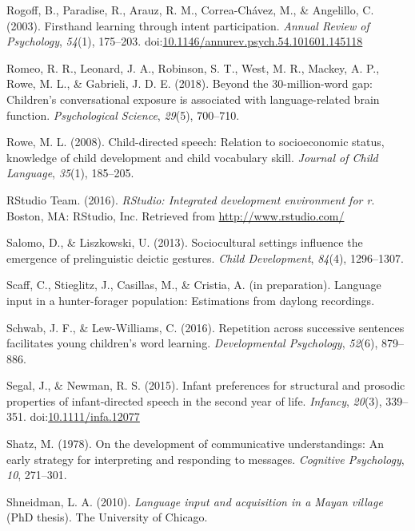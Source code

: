 \documentclass[floatsintext,man]{apa6}
\theoremstyle{definition}
\theoremstyle{definition}
\theoremstyle{definition}
\theoremstyle{remark}
\begin{document}
\hypertarget{ref-rogoff2003firsthand}{}
Rogoff, B., Paradise, R., Arauz, R. M., Correa-Chávez, M., \& Angelillo,
C. (2003). Firsthand learning through intent participation. \emph{Annual
Review of Psychology}, \emph{54}(1), 175--203.
doi:\href{https://doi.org/10.1146/annurev.psych.54.101601.145118}{10.1146/annurev.psych.54.101601.145118}

\hypertarget{ref-romeo2018beyond}{}
Romeo, R. R., Leonard, J. A., Robinson, S. T., West, M. R., Mackey, A.
P., Rowe, M. L., \& Gabrieli, J. D. E. (2018). Beyond the
30-million-word gap: Children's conversational exposure is associated
with language-related brain function. \emph{Psychological Science},
\emph{29}(5), 700--710.

\hypertarget{ref-rowe2008child}{}
Rowe, M. L. (2008). Child-directed speech: Relation to socioeconomic
status, knowledge of child development and child vocabulary skill.
\emph{Journal of Child Language}, \emph{35}(1), 185--205.

\hypertarget{ref-R-studio}{}
RStudio Team. (2016). \emph{RStudio: Integrated development environment
for r}. Boston, MA: RStudio, Inc. Retrieved from
\url{http://www.rstudio.com/}

\hypertarget{ref-salomo2013sociocultural}{}
Salomo, D., \& Liszkowski, U. (2013). Sociocultural settings influence
the emergence of prelinguistic deictic gestures. \emph{Child
Development}, \emph{84}(4), 1296--1307.

\hypertarget{ref-scaffIPlanguage}{}
Scaff, C., Stieglitz, J., Casillas, M., \& Cristia, A. (in preparation).
Language input in a hunter-forager population: Estimations from daylong
recordings.

\hypertarget{ref-schwab2016repetition}{}
Schwab, J. F., \& Lew-Williams, C. (2016). Repetition across successive
sentences facilitates young children's word learning.
\emph{Developmental Psychology}, \emph{52}(6), 879--886.

\hypertarget{ref-segal2015infant}{}
Segal, J., \& Newman, R. S. (2015). Infant preferences for structural
and prosodic properties of infant-directed speech in the second year of
life. \emph{Infancy}, \emph{20}(3), 339--351.
doi:\href{https://doi.org/10.1111/infa.12077}{10.1111/infa.12077}

\hypertarget{ref-shatz1978development}{}
Shatz, M. (1978). On the development of communicative understandings: An
early strategy for interpreting and responding to messages.
\emph{Cognitive Psychology}, \emph{10}, 271--301.

\hypertarget{ref-shneidman2010language}{}
Shneidman, L. A. (2010). \emph{Language input and acquisition in a Mayan
village} (PhD thesis). The University of Chicago.
\end{document}
